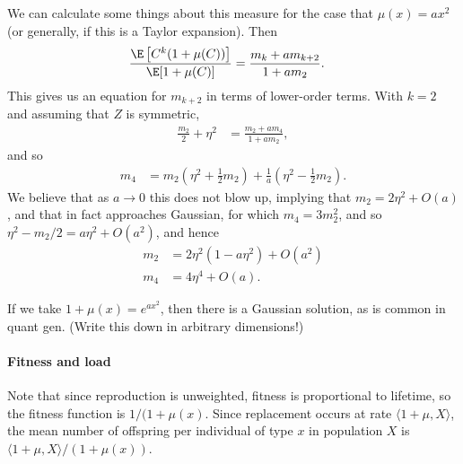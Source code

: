 \documentclass{article}
\newcommand{\ip}[2]{\langle #1, #2 \rangle}
\begin{document}
We can calculate some things about this measure
for the case that $\mu(x) = ax^2$ 
(or generally, if this is a Taylor expansion).
Then
$$\begin{aligned}
    \frac{\E\left[ C^k (1+\mu(C)) \right]}{\E[1+\mu(C)]} 
    &=
    \frac{ m_k + a m_{k+2} }{ 1 + a m_2 } .
\end{aligned}$$
This gives us an equation for $m_{k+2}$ in terms of lower-order terms.
With $k=2$ and assuming that $Z$ is symmetric,
$$\begin{aligned}
    \frac{m_2}{2} + \eta^2
    &=
    \frac{ m_2 + a m_4 }{ 1 + a m_2 },
\end{aligned}$$
and so 
$$\begin{aligned}
    m_4
    &= m_2 \left( \eta^2 + \frac{1}{2} m_2 \right) 
       + \frac{1}{a} \left( \eta^2 - \frac{1}{2} m_2 \right) .
\end{aligned}$$
We believe that as $a \to 0$ this does not blow up,
implying that $m_2 = 2 \eta^2 + O(a)$,
and that in fact approaches Gaussian, for which $m_4 = 3m_2^2$,
and so $\eta^2 - m_2/2 = a \eta^2 + O(a^2)$,
and hence
$$\begin{aligned}
    m_2 &= 2 \eta^2 ( 1 - a \eta^2 ) + O(a^2)  \\
    m_4 &= 4 \eta^4 + O(a) .
\end{aligned}$$

If we take $1+\mu(x) = e^{ax^2}$,
then there is a Gaussian solution,
as is common in quant gen.
(Write this down in arbitrary dimensions!)


\paragraph{Fitness and load}
Note that since reproduction is unweighted,
fitness is proportional to lifetime,
so the fitness function is $1/(1+\mu(x)$.
Since replacement occurs at rate $\ip{1+\mu}{X}$,
the mean number of offspring per individual of type $x$
in population $X$ is $\ip{1+\mu}{X} / (1+\mu(x))$.
\end{document}
